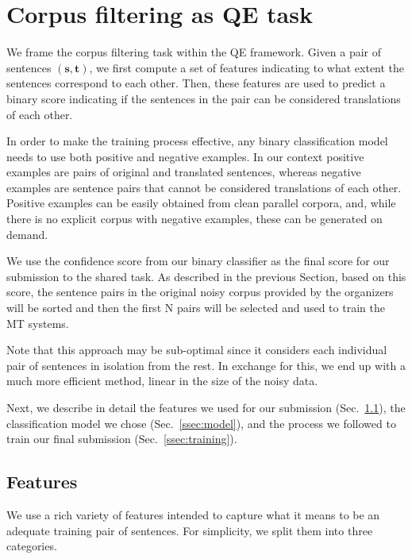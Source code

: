 \section{Corpus filtering as QE task}

We frame the corpus filtering task within the QE framework. Given a pair of sentences $(\mathbf{s}, \mathbf{t})$, we first compute a set of features indicating to what extent the sentences correspond to each other. Then, these features are used to predict a binary score indicating if the sentences in the pair can be considered translations of each other.

In order to make the training process effective, any binary classification model needs to use both positive and negative examples. In our context positive examples are pairs of original and translated sentences, whereas negative examples are sentence pairs that cannot be considered translations of each other. Positive examples can be easily obtained from clean parallel corpora, and, while there is no explicit corpus with negative examples, these can be generated on demand.

We use the confidence score from our binary classifier as the final score for our submission to the shared task. As described in the previous Section, based on this score, the sentence pairs in the original noisy corpus provided by the organizers will be sorted and then the first N pairs will be selected and used to train the MT systems.

Note that this approach may be sub-optimal since it considers each individual pair of sentences in isolation from the rest. In exchange for this, we end up with a much more efficient method, linear in the size of the noisy data.

Next, we describe in detail the features we used for our submission (Sec.~\ref{ssec:features}), the classification model we chose (Sec.~\ref{ssec:model}), and the process we followed to train our final submission (Sec.~\ref{ssec:training}).

\subsection{Features}
\label{ssec:features}

We use a rich variety of features intended to capture what it means to be an adequate training pair of sentences. For simplicity, we split them into three categories.

